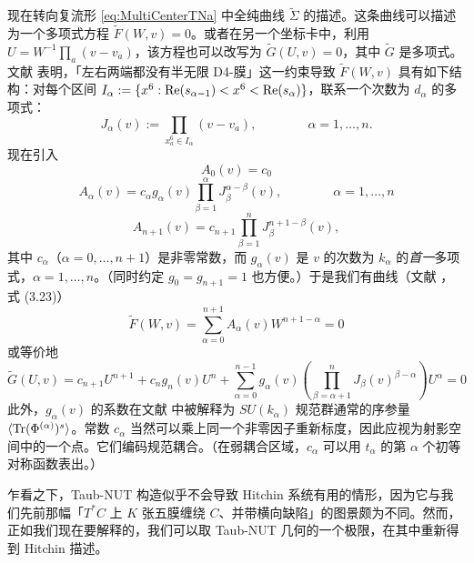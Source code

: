 现在转向复流形 \eqref{eq:MultiCenterTNa} 中全纯曲线 $\tilde \Sigma$ 的描述。这条曲线可以描述为一个多项式方程 $\tilde F(W,v)=0$。或者在另一个坐标卡中，利用 $U=W^{-1} \prod_a (v-v_a)$，该方程也可以改写为 $\tilde G(U,v)=0$，其中 $\tilde G$ 是多项式。文献 \cite{Witten:1997sc} 表明，「左右两端都没有半无限 D4-膜」这一约束导致 $\tilde F(W,v)$ 具有如下结构：对每个区间 $I_\alpha := \{ x^6: {\rm Re}(s_{\alpha -1}) < x^6 < {\rm Re}(s_\alpha)\}$，联系一个次数为 $d_\alpha$ 的多项式：
\begin{equation}\label{eq:ch05-Jalpha}
J_\alpha(v):= \prod_{x^6_a\in I_\alpha} (v-v_a), \qquad\qquad \alpha=1,\dots, n.
\end{equation}
现在引入
\begin{equation}\label{eq:Aalphdef}
A_0(v) = c_0
\end{equation}
\begin{equation}\label{eq:Aalphdef-2}
A_\alpha(v) = c_\alpha g_\alpha(v) \prod_{\beta =1}^{\alpha }
J_\beta^{\alpha-\beta}(v), \qquad\qquad \alpha = 1, \dots, n
\end{equation}
\begin{equation}\label{eq:Aalphdef-3}
A_{n+1}(v)  = c_{n+1}   \prod_{\beta =1}^{n}
J_\beta^{n+1-\beta}(v),
\end{equation}
其中 $c_\alpha$（$\alpha = 0, \dots, n+1$）是非零常数，而 $g_{\alpha}(v)$ 是 $v$ 的次数为 $k_\alpha$ 的\emph{首一}多项式，$\alpha = 1, \dots, n$。（同时约定 $g_0 = g_{n+1}=1$ 也方便。）于是我们有曲线（文献 \cite{Witten:1997sc}，式 (3.23)）
\begin{equation}\label{eq:TNCurveii}
\tilde F(W,v) =  \sum_{\alpha=0}^{n+1} A_\alpha(v) W^{n+1-\alpha}=0
\end{equation}
或等价地
\begin{equation}\label{eq:TNCurveiii}
\tilde G(U,v) =  c_{n+1}U^{n+1} + c_n g_n(v) U^n + \sum_{\alpha=0}^{n-1}
g_{\alpha}(v)\left( \prod_{\beta = \alpha+1}^n J_\beta(v)^{\beta-\alpha}\right) U^\alpha =0
\end{equation}
此外，$g_{\alpha}(v)$ 的系数在文献 \cite{Witten:1997sc} 中被解释为 $SU(k_\alpha)$ 规范群通常的序参量 $\langle {\operatorname{Tr}}(\Phi^{(\alpha)})^s\rangle$。常数 $c_\alpha$ 当然可以乘上同一个非零因子重新标度，因此应视为射影空间中的一个点。它们编码规范耦合。（在弱耦合区域，$c_\alpha$ 可以用 $t_\alpha$ 的第 $\alpha$ 个初等对称函数表出。）

乍看之下，Taub-NUT 构造似乎不会导致 Hitchin 系统有用的情形，因为它与我们先前那幅「$T^*C$ 上 $K$ 张五膜缠绕 $C$、并带横向缺陷」的图景颇为不同。然而，正如我们现在要解释的，我们可以取 Taub-NUT 几何的一个极限，在其中重新得到 Hitchin 描述。

